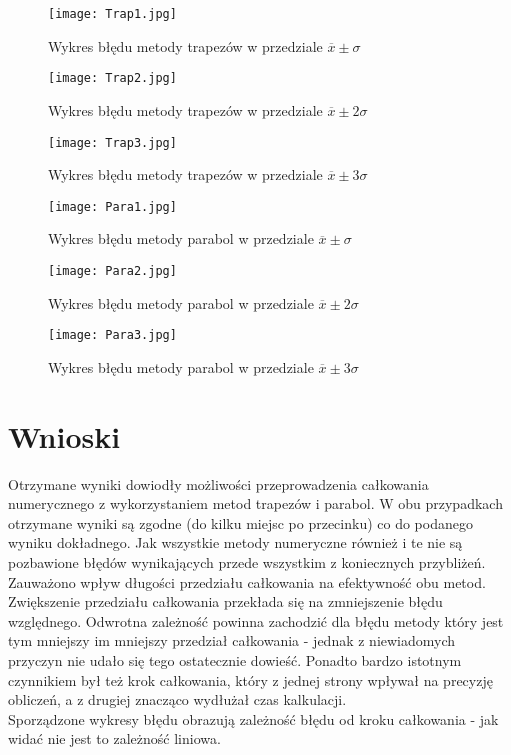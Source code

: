 \documentclass{article}
\begin{document}
\begin{figure}
	\centering
	 \texttt{[image: Trap1.jpg]} 
	\caption{Wykres błędu metody trapezów w przedziale $\overline{x}\pm\sigma$}
	\label{fig:Trap1.jpg}
\end{figure}
\begin{figure}
	\centering
	\texttt{[image: Trap2.jpg]} 
	\caption{Wykres błędu metody trapezów w przedziale $\overline{x}\pm2\sigma$}
	\label{fig:Trap2.jpg}
\end{figure}
	 \begin{figure}
	 	\centering
	  \texttt{[image: Trap3.jpg]} 
	 	\caption{Wykres błędu metody trapezów w przedziale $\overline{x}\pm3\sigma$}
	 	\label{fig:Trap2.jpg}
	 \end{figure}
	  \begin{figure}
	 	\centering
	 	\texttt{[image: Para1.jpg]} 
	 	\caption{Wykres błędu metody parabol w przedziale $\overline{x}\pm\sigma$}
	 	\label{fig:Para1.jpg}
	 \end{figure}
		  \begin{figure}
		\centering
	\texttt{[image: Para2.jpg]}
	\caption{Wykres błędu metody parabol w przedziale $\overline{x}\pm2\sigma$}
		\label{fig:Para2.jpg}
	\end{figure}
	
	 		  \begin{figure}
	 	\centering
	  \texttt{[image: Para3.jpg]}
	 	\caption{Wykres błędu metody parabol w przedziale $\overline{x}\pm3\sigma$}
	 	\label{fig:Para3.jpg}
	 \end{figure}
	 
	
	 
\newpage

	\section{Wnioski}
	Otrzymane wyniki dowiodły możliwości przeprowadzenia całkowania numerycznego z wykorzystaniem metod trapezów i parabol. W obu przypadkach otrzymane wyniki są zgodne (do kilku miejsc po przecinku) co do podanego wyniku dokładnego. Jak wszystkie metody numeryczne również i te nie są pozbawione błędów wynikających przede wszystkim z koniecznych przybliżeń.\\
	Zauważono wpływ długości przedziału całkowania na efektywność obu metod. Zwiększenie przedziału całkowania przekłada się na zmniejszenie błędu względnego. Odwrotna zależność powinna zachodzić dla błędu metody który jest tym mniejszy im mniejszy przedział całkowania - jednak z niewiadomych przyczyn nie udało się tego ostatecznie dowieść.  Ponadto bardzo istotnym czynnikiem był też krok całkowania, który z jednej strony wpływał na precyzję obliczeń, a z drugiej znacząco wydłużał czas kalkulacji.\\
	Sporządzone wykresy błędu  obrazują zależność błędu od kroku całkowania - jak widać nie jest to zależność liniowa.
\end{document}
